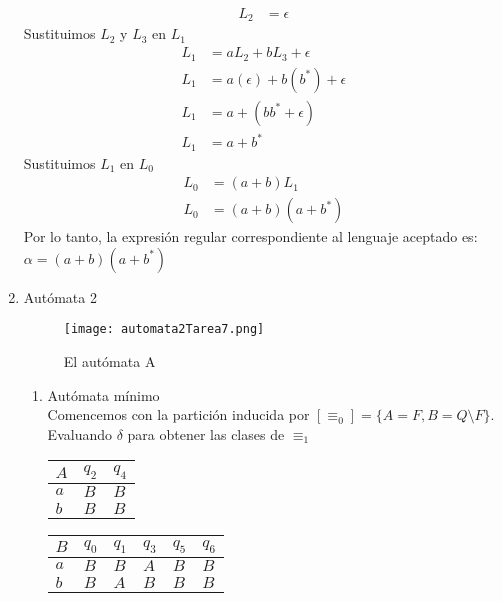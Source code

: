 \documentclass{article}
\begin{document}
\begin{enumerate}
{\begin{enumerate}
{\begin{align*}
    				L_{2} &= \epsilon
    			\end{align*}
    			Sustituimos $L_{2}$ y $L_{3}$ en $L_{1}$
    			\begin{align*}
    				L_{1} &= aL_{2} + bL_{3} + \epsilon\\
    				L_{1} &= a(\epsilon) + b(b^*) + \epsilon\\
    				L_{1} &= a + (bb^* + \epsilon)\\
    				L_{1} &= a + b^*
    			\end{align*}
    			Sustituimos $L_{1}$ en $L_{0}$
    			\begin{align*}
    				L_{0} &= (a+b)L_{1}\\
    				L_{0} &= (a+b)(a + b^*)
    			\end{align*}
                Por lo tanto, la expresión regular correspondiente al lenguaje 
                aceptado es: $\alpha = (a+b)(a + b^*)$
    		}
    			\end{enumerate}
			}
    	\item {
    		Autómata 2
    		\begin{figure} [H]
    			\centering
    			\texttt{[image: automata2Tarea7.png]}
    			\caption{El autómata A}
    		\end{figure}
    
            \begin{enumerate}
                \item {
                Autómata mínimo\\
                Comencemos con la partición inducida por $[\equiv_{0}] = 
                \{A = F, B = Q \setminus F\}$.\\
                Evaluando $\delta$ para obtener las clases de $\equiv_{1}$
                
                    \begin{table}[H]
                        \centering
                        \begin{tabular}{|l|l|l|}
                            \hline
                            $A$ & $q_{2}$ & $q_4$ \\ \hline
                            $a$      & $B$     & $B$   \\ \hline
                            $b$      & $B$     & $B$   \\ \hline
                        \end{tabular}
                        \quad
                        \begin{tabular}{|l|l|l|l|l|l|}
                            \hline
                            $B$ & $q_{0}$ & $q_{1}$ & $q_{3}$ & $q_{5}$ & $q_{6}$ \\ \hline
                            $a$      & $B$     & $B$     & $A$     & $B$     & $B$     \\ \hline
                            $b$      & $B$     & $A$     & $B$     & $B$     & $B$     \\ \hline
                        \end{tabular}
                    \end{table}

}
\end{enumerate}}
\end{enumerate}
\end{document}
